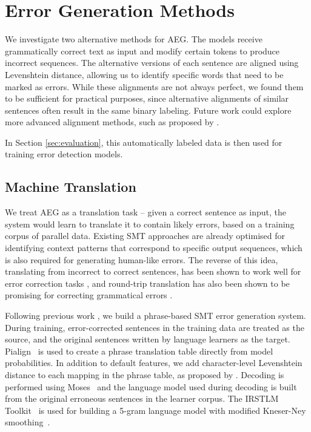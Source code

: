 \documentclass[11pt,letterpaper]{article}
\begin{document}
\section{Error Generation Methods}
\label{sec:methods}

We investigate two alternative methods for AEG. The models receive grammatically correct text as input and modify certain tokens to produce incorrect sequences. The alternative versions of each sentence are aligned using Levenshtein distance, allowing us to identify specific words that need to be marked as errors. While these alignments are not always perfect, we found them to be sufficient for practical purposes, since alternative alignments of similar sentences often result in the same binary labeling.
Future work could explore more advanced alignment methods, such as proposed by .

In Section \ref{sec:evaluation}, this automatically labeled data is then used for training error detection models.


\subsection{Machine Translation}

We treat AEG as a translation task -- given a correct sentence as input, the system would learn to translate it to contain likely errors, based on a training corpus of parallel data.
Existing SMT approaches are already optimised for identifying context patterns that correspond to specific output sequences, which is also required for generating human-like errors.
The reverse of this idea, translating from incorrect to correct sentences, has been shown to work well for error correction tasks \cite{Brockett2006,Ng2013a}, and round-trip translation has also been shown to be promising for correcting grammatical errors \cite{madnani-tetreault-chodorow}.

Following previous work \cite{Brockett2006,Yuan-Felice:2013}, we build a phrase-based SMT error generation system. 
During training, error-corrected sentences in the training data are treated as the source, and the original sentences written by language learners as the target. Pialign~\cite{Pialign} is used to create a phrase translation table directly from model probabilities. 
In addition to default features, we add character-level Levenshtein distance to each mapping in the phrase table, as proposed by . 
Decoding is performed using Moses~\cite{Moses} and the language model used during decoding is built from the original erroneous sentences in the learner corpus. 
The IRSTLM Toolkit~\cite{IRSTLM} is used for building a 5-gram language model with modified Kneser-Ney smoothing~\cite{Kneser1995}. 
\end{document}
